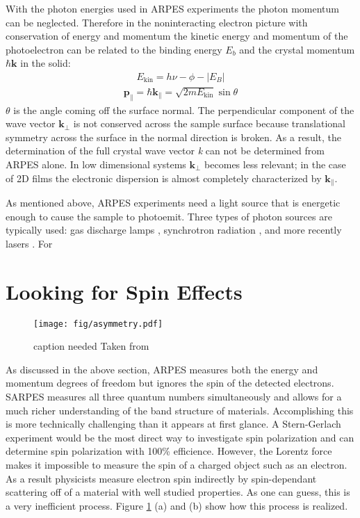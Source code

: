 \documentclass[12pt]{article}
\begin{document}
With the photon energies used in ARPES experiments the photon momentum can be neglected.
Therefore in the noninteracting electron picture with conservation of energy and momentum the kinetic energy and momentum of the photoelectron can be related to the binding energy $E_b$ and the crystal momentum $\hbar\boldsymbol{k}$ in the solid\cite{Damascelli}:
\begin{align}
  E_{\text{kin}}=h\nu-\phi-|E_B|
\end{align}
\begin{align}
  \boldsymbol{p_{\parallel}}=\hbar\boldsymbol{k_{\parallel}}=\sqrt{2mE_{\text{kin}}}\sin\theta
\end{align}
$\theta$ is the angle coming off the surface normal.
The perpendicular component of the wave vector $\boldsymbol{k_{\perp}}$ is not conserved across the sample surface because translational symmetry across the surface in the normal direction is broken.  
As a result, the determination of the full crystal wave vector \emph{k} can not be determined from ARPES alone.
In low dimensional systems $\boldsymbol{k_{\perp}}$ becomes less relevant; in the case of 2D films the electronic dispersion is almost completely characterized by $\boldsymbol{k_{\parallel}}$.


As mentioned above, ARPES experiments need a light source that is energetic enough to cause the sample to photoemit.
Three types of photon sources are typically used:  gas discharge lamps \cite{Damascelli}, synchrotron radiation \cite{Damascelli}, and more recently lasers \cite{Dessau}.
For 



\section{Looking for Spin Effects}
\begin{figure}[h]
  \centering
  \texttt{[image: fig/asymmetry.pdf]}
  \caption[should I put this here?]
  {caption needed Taken from \cite{Okuda-Kimura}}
  \label{fig:asymmetry}
\end{figure}
As discussed in the above section, ARPES measures both the energy and momentum degrees of freedom but ignores the spin of the detected electrons.
SARPES measures all three quantum numbers simultaneously and allows for a much richer understanding of the band structure of materials.
Accomplishing this is more technically challenging than it appears at first glance.
A Stern-Gerlach experiment would be the most direct way to investigate spin polarization and can determine spin polarization with 100\% efficience.
However, the Lorentz force makes it impossible to measure the spin of a charged object such as an electron.
As a result physicists measure electron spin indirectly by spin-dependant scattering off of a material with well studied properties.
As one can guess, this is a very inefficient process.
Figure \ref{fig:asymmetry} (a) and (b) show how this process is realized.
\end{document}
